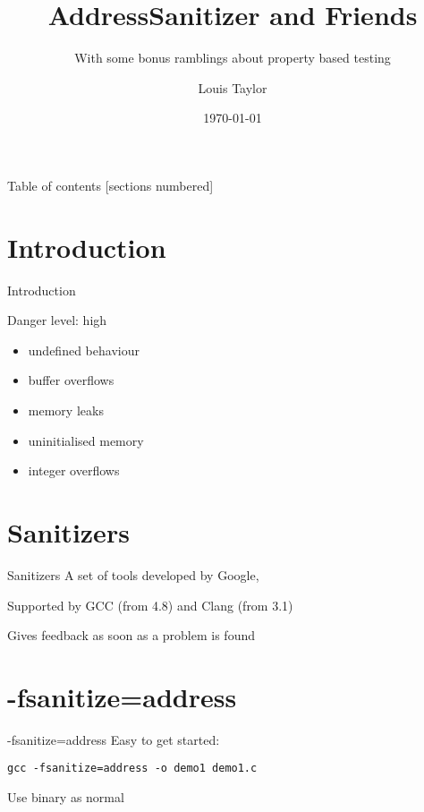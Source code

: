 \documentclass[10pt]{beamer}
\title{AddressSanitizer and Friends}
\subtitle{With some bonus ramblings about property based testing}
\date{\today}
\date{}
\author{Louis Taylor}
\begin{document}
\maketitle

\begin{frame}{Table of contents}
  [sections numbered]
  \tableofcontents %
\end{frame}

\section{Introduction}

\begin{frame}[fragile]{Introduction}

Danger level: high

\begin{itemize}
    \item undefined behaviour
    \item buffer overflows
    \item memory leaks
    \item uninitialised memory
    \item integer overflows
\end{itemize}
\end{frame}

\section{Sanitizers}

\begin{frame}[fragile]{Sanitizers}
A set of tools developed by Google,

Supported by GCC (from 4.8) and Clang (from 3.1)

Gives feedback as soon as a problem is found
\end{frame}

\section{-fsanitize=address}

\begin{frame}[fragile]{-fsanitize=address}
  Easy to get started:
  
  \begin{verbatim}gcc -fsanitize=address -o demo1 demo1.c\end{verbatim}
  
  Use binary as normal

\end{frame}
\end{document}
